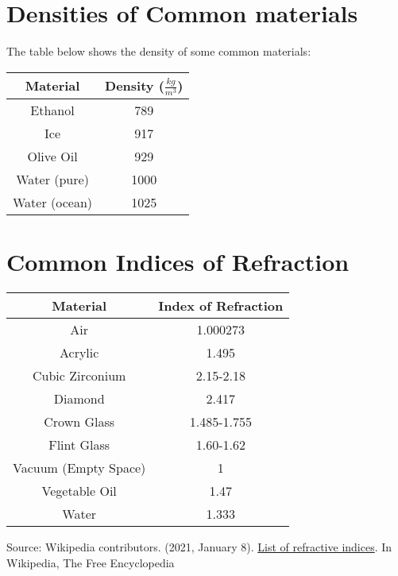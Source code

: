 \section{Densities of Common materials}


	The table below shows the density of some common materials:
\begin{center}
	\begin{table}[h]
			\caption{\label{tab:density}Table of Densities of Common Materials}
	\begin{longtable}{|c|c|} 
		\hline
		\textbf{Material} & \textbf{Density} ($\frac{kg}{m^3}$) \\
		\hline
		Ethanol &  789 \\
		\hline
		Ice &  917 \\
		\hline
		Olive Oil & 929 \\
		\hline
		Water (pure) & 1000 \\
		\hline 
		Water (ocean) & 1025 \\
		\hline
		
		
		
	\end{longtable}
\end{table}
\end{center}

\section{Common Indices of Refraction}
\begin{center}



	\begin{table}[h]
	\caption{\label{tab:refraction}Table of Common Indices of Refraction}
	
	\begin{longtable}{|c |c|}
		\hline
		\textbf{Material} & \textbf{Index of Refraction} \\
		\hline
		Air & 1.000273 \\
		\hline
		Acrylic & 1.495 \\
		\hline
		Cubic Zirconium & 2.15-2.18\\
		\hline
		Diamond & 2.417 \\
		\hline
		Crown Glass & 1.485-1.755\\
		\hline
		Flint Glass & 1.60-1.62 \\
		\hline
		Vacuum (Empty Space) & 1 \\
		\hline
		Vegetable Oil &1.47 \\
		\hline
		Water & 1.333 \\		
		\hline

	\end{longtable}


\end{table}
\end{center}
Source: Wikipedia contributors. (2021, January 8). \href{https://en.wikipedia.org/wiki/List_of_refractive_indices}{List of refractive indices}. In Wikipedia, The Free Encyclopedia


